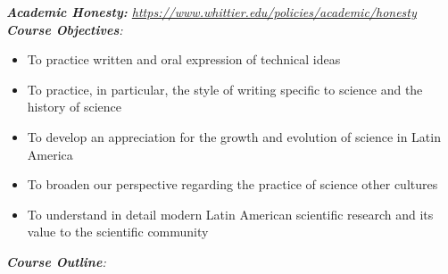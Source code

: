 \documentclass[10pt]{article}
\begin{document}
\textit{\textbf{Academic Honesty:} \url{https://www.whittier.edu/policies/academic/honesty}} \\
\noindent
\textit{\textbf{Course Objectives}:}
\begin{itemize}
\item To practice written and oral expression of technical ideas
\item To practice, in particular, the style of writing specific to science and the history of science
\item To develop an appreciation for the growth and evolution of science in Latin America
\item To broaden our perspective regarding the practice of science other cultures
\item To understand in detail modern Latin American scientific research and its value to the scientific community
\end{itemize}
\clearpage
\twocolumn
\textit{\textbf{Course Outline}:}
\end{document}
